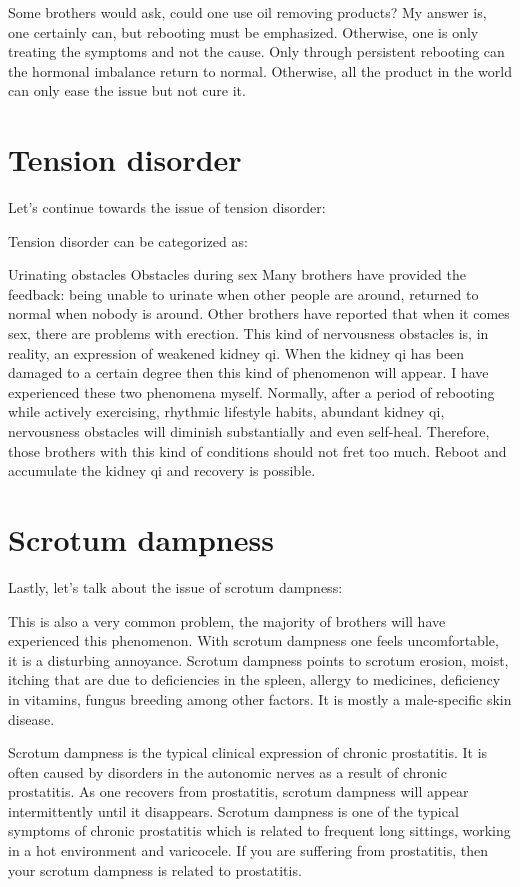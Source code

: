 \documentclass[
]{book}
\begin{document}
Some brothers would ask, could one use oil removing products? My answer is, one certainly can, but rebooting must be emphasized. Otherwise, one is only treating the symptoms and not the cause. Only through persistent rebooting can the hormonal imbalance return to normal. Otherwise, all the product in the world can only ease the issue but not cure it.

\hypertarget{tension-disorder}{%
\section{Tension disorder}\label{tension-disorder}}

Let's continue towards the issue of tension disorder:

Tension disorder can be categorized as:

Urinating obstacles
Obstacles during sex
Many brothers have provided the feedback: being unable to urinate when other people are around, returned to normal when nobody is around. Other brothers have reported that when it comes sex, there are problems with erection. This kind of nervousness obstacles is, in reality, an expression of weakened kidney qi. When the kidney qi has been damaged to a certain degree then this kind of phenomenon will appear. I have experienced these two phenomena myself. Normally, after a period of rebooting while actively exercising, rhythmic lifestyle habits, abundant kidney qi, nervousness obstacles will diminish substantially and even self-heal. Therefore, those brothers with this kind of conditions should not fret too much. Reboot and accumulate the kidney qi and recovery is possible.

\hypertarget{scrotum-dampness}{%
\section{Scrotum dampness}\label{scrotum-dampness}}

Lastly, let's talk about the issue of scrotum dampness:

This is also a very common problem, the majority of brothers will have experienced this phenomenon. With scrotum dampness one feels uncomfortable, it is a disturbing annoyance. Scrotum dampness points to scrotum erosion, moist, itching that are due to deficiencies in the spleen, allergy to medicines, deficiency in vitamins, fungus breeding among other factors. It is mostly a male-specific skin disease.

Scrotum dampness is the typical clinical expression of chronic prostatitis. It is often caused by disorders in the autonomic nerves as a result of chronic prostatitis. As one recovers from prostatitis, scrotum dampness will appear intermittently until it disappears. Scrotum dampness is one of the typical symptoms of chronic prostatitis which is related to frequent long sittings, working in a hot environment and varicocele. If you are suffering from prostatitis, then your scrotum dampness is related to prostatitis.
\end{document}
